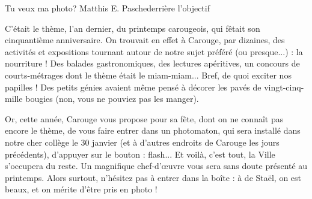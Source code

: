 \vspace*{-5mm}
\begin{article}
{Tu veux ma photo?}
{Matthis E. Pasche}{derrière l'objectif}

 C'était le thème, l'an dernier, du printemps carougeois, qui fêtait son cinquantième anniversaire. On trouvait en effet à Carouge, par dizaines, des  activités et expositions tournant autour de notre sujet préféré (ou presque...) : la nourriture ! Des balades gastronomiques, des lectures apéritives, un concours de courts-métrages dont le thème était \columnbreak le miam-miam... Bref, de quoi exciter nos papilles ! Des petits génies avaient même pensé à décorer les pavés de vingt-cinq-mille bougies (non, vous ne pouviez pas les manger).

Or, cette année, Carouge vous propose pour sa fête, dont on ne connaît pas encore le thème, de vous faire entrer dans un photomaton, qui sera installé dans notre cher collège le 30 janvier (et à d'autres endroits de Carouge les jours précédents), d'appuyer sur le bouton : flash... Et voilà, c'est tout, la Ville s'occupera du reste. Un magnifique chef-d'œuvre vous sera sans doute présenté au printemps. Alors surtout, n'hésitez pas à entrer dans la boîte : à de Staël, on est beaux, et on mérite d'être pris en photo !
\end{article}

\newpage




